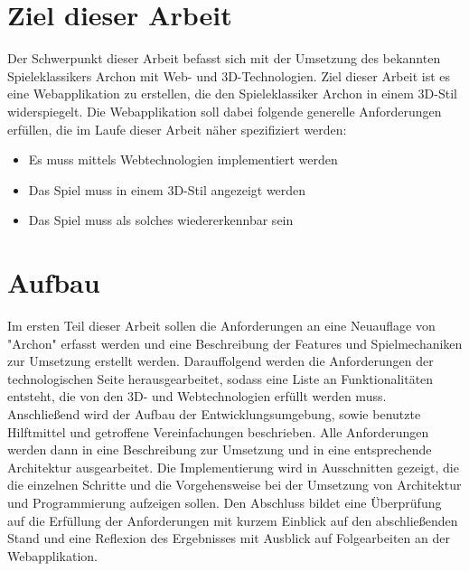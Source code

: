 \section{Ziel dieser Arbeit}
\label{sec:ziel_dieser_arbeit}
Der Schwerpunkt dieser Arbeit befasst sich mit der Umsetzung des bekannten Spieleklassikers Archon mit Web- und 3D-Technologien.
Ziel dieser Arbeit ist es eine Webapplikation zu erstellen, die den Spieleklassiker Archon in einem 3D-Stil widerspiegelt.
Die Webapplikation soll dabei folgende generelle Anforderungen erfüllen, die im Laufe dieser Arbeit näher spezifiziert werden:
\begin{itemize}
	\item Es muss mittels Webtechnologien implementiert werden
	\item Das Spiel muss in einem 3D-Stil angezeigt werden
	\item Das Spiel muss als solches wiedererkennbar sein
\end{itemize}

\section{Aufbau}
\label{sec:aufbau}

Im ersten Teil dieser Arbeit sollen die Anforderungen an eine Neuauflage von "Archon" erfasst werden und eine Beschreibung der Features und Spielmechaniken zur Umsetzung erstellt werden.
Darauffolgend werden die Anforderungen der technologischen Seite herausgearbeitet, sodass eine Liste an Funktionalitäten entsteht, die von den 3D- und Webtechnologien erfüllt werden muss.
Anschließend wird der Aufbau der Entwicklungsumgebung, sowie benutzte Hilftmittel und getroffene Vereinfachungen beschrieben.
Alle Anforderungen werden dann in eine Beschreibung zur Umsetzung und in eine entsprechende Architektur ausgearbeitet.
Die Implementierung wird in Ausschnitten gezeigt, die die einzelnen Schritte und die Vorgehensweise bei der Umsetzung von Architektur und Programmierung aufzeigen sollen.
Den Abschluss bildet eine Überprüfung auf die Erfüllung der Anforderungen mit kurzem Einblick auf den abschließenden Stand und eine Reflexion des Ergebnisses mit Ausblick auf Folgearbeiten an der Webapplikation.